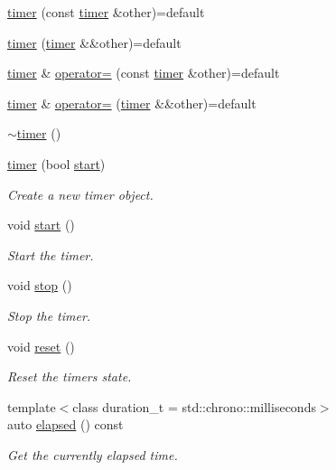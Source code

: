 \begin{DoxyCompactItemize}
\item 
\mbox{\hyperlink{classmoka_1_1timer_a5149e986b24529d0dbb8f5ab2f0f19a6}{timer}} (const \mbox{\hyperlink{classmoka_1_1timer}{timer}} \&other)=default
\item 
\mbox{\hyperlink{classmoka_1_1timer_a527fcdb18531598d937ba2b193c4fdbc}{timer}} (\mbox{\hyperlink{classmoka_1_1timer}{timer}} \&\&other)=default
\item 
\mbox{\hyperlink{classmoka_1_1timer}{timer}} \& \mbox{\hyperlink{classmoka_1_1timer_a9afec3a2d5cda9c48b1fad91441ff547}{operator=}} (const \mbox{\hyperlink{classmoka_1_1timer}{timer}} \&other)=default
\item 
\mbox{\hyperlink{classmoka_1_1timer}{timer}} \& \mbox{\hyperlink{classmoka_1_1timer_ab301e83e7655cfbb816d958570307807}{operator=}} (\mbox{\hyperlink{classmoka_1_1timer}{timer}} \&\&other)=default
\item 
\mbox{\hyperlink{classmoka_1_1timer_ab78e8d9acc9e7577e3fa0db5fb3dde07}{$\sim$timer}} ()
\item 
\mbox{\hyperlink{classmoka_1_1timer_abfc5a3eaf59b009613f7e763b5d89da9}{timer}} (bool \mbox{\hyperlink{classmoka_1_1timer_a7b1073657d0a16b347c4e7c0291b2ef9}{start}})
\begin{DoxyCompactList}\small\item\em Create a new timer object. \end{DoxyCompactList}\item 
void \mbox{\hyperlink{classmoka_1_1timer_a7b1073657d0a16b347c4e7c0291b2ef9}{start}} ()
\begin{DoxyCompactList}\small\item\em Start the timer. \end{DoxyCompactList}\item 
void \mbox{\hyperlink{classmoka_1_1timer_a1ef4c99828b76e137e7151688c94aa00}{stop}} ()
\begin{DoxyCompactList}\small\item\em Stop the timer. \end{DoxyCompactList}\item 
void \mbox{\hyperlink{classmoka_1_1timer_a3690eb93f4f91c1650f9fd3589c3adb9}{reset}} ()
\begin{DoxyCompactList}\small\item\em Reset the timer\textquotesingle{}s state. \end{DoxyCompactList}\item 
{\footnotesize template$<$class duration\+\_\+t  = std\+::chrono\+::milliseconds$>$ }\\auto \mbox{\hyperlink{classmoka_1_1timer_a077bf849a8a901506c971a5f1287abea}{elapsed}} () const
\begin{DoxyCompactList}\small\item\em Get the currently elapsed time. \end{DoxyCompactList}\end{DoxyCompactItemize}


